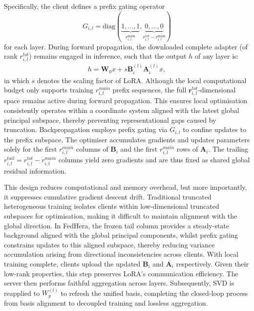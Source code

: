 \documentclass{article}
\begin{document}
Specifically, the client defines a prefix gating operator 
$$G_{i,l}=\mathrm{diag}(\underbrace{1,\dots,1}_{r^{\mathrm{main}}_{i,l}},\underbrace{0,\dots,0}_{r^{\mathrm{tot}}_{i,l}-r^{\mathrm{main}}_{i,l}})$$
for each layer. During forward propagation, the downloaded complete adapter (of rank $r_{i, l}^{tot}$) remains engaged in inference, such that the output $h$ of any layer is:
\begin{align}
    h = \mathbf{W}_{0}x+s\mathbf{B}_{i}^{(l)}\mathbf{A}_{i}^{(l)}x,
\end{align}
in which $s$ denotes the scaling factor of LoRA. Although the local computational budget only supports training $r_{i, l}^{main}$ prefix sequences, the full $\mathbf{r}_{i, l}^{tot}$-dimensional space remains active during forward propagation. This ensures local optimisation consistently operates within a coordinate system aligned with the latest global principal subspace, thereby preventing representational gaps caused by truncation. Backpropagation employs prefix gating via $G_{i,l}$ to confine updates to the prefix subspace. The optimiser accumulates gradients and updates parameters solely for the first $r_{i, l}^{main}$ columns of $\mathbf{B}_{i}$ and the first $r_{i, l}^{main}$ rows of $\mathbf{A}_{i}$. The trailing $r_{i, l}^{tail}=r_{i, l}^{tot}- r_{i, l}^{main}$ columns yield zero gradients and are thus fixed as shared global residual information.

This design reduces computational and memory overhead, but more importantly, it suppresses cumulative gradient descent drift. Traditional truncated heterogeneous training isolates clients within low-dimensional truncated subspaces for optimisation, making it difficult to maintain alignment with the global direction. In FedHera, the frozen tail column provides a steady-state background aligned with the global principal components, whilst prefix gating constrains updates to this aligned subspace, thereby reducing variance accumulation arising from directional inconsistencies across clients. With local training complete, clients upload the updated $\mathbf{B}_{i}$ and $\mathbf{A}_{i}$ respectively. Given their low-rank properties, this step preserves LoRA's communication efficiency. The server then performs faithful aggregation across layers. Subsequently, SVD is reapplied to $W_g^{(l)}$ to refresh the unified basis, completing the closed-loop process from basis alignment to decoupled training and lossless aggregation.
\end{document}
